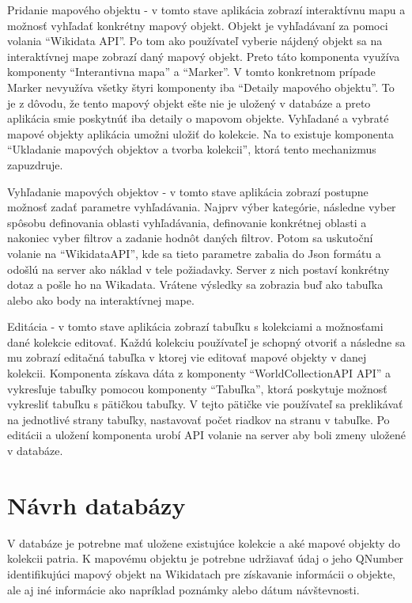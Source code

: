 Pridanie mapového objektu - v tomto stave aplikácia zobrazí interaktívnu mapu a možnosť vyhľadať konkrétny mapový objekt. Objekt je vyhľadávaní za pomoci volania “Wikidata API”.
Po tom ako používateľ vyberie nájdený objekt sa na interaktívnej mape zobrazí daný mapový objekt. Preto táto komponenta využíva komponenty “Interantivna mapa” a “Marker”. V tomto konkretnom prípade
Marker nevyužíva všetky štyri komponenty iba “Detaily mapového objektu”. To je z dôvodu, že tento mapový objekt ešte nie je uložený v databáze a preto aplikácia smie poskytnúť iba detaily o mapovom objekte.
Vyhľadané a vybraté mapové objekty aplikácia umožni uložiť do kolekcie. Na to existuje komponenta “Ukladanie mapových objektov a tvorba kolekcii”, ktorá tento mechanizmus zapuzdruje.

Vyhľadanie mapových objektov - v tomto stave aplikácia zobrazí postupne možnosť zadať parametre vyhľadávania. Najprv výber kategórie, následne vyber spôsobu definovania oblasti vyhľadávania, definovanie konkrétnej
oblasti a nakoniec vyber filtrov a zadanie hodnôt daných filtrov. Potom sa uskutoční volanie na “WikidataAPI”, kde sa tieto parametre zabalia do Json formátu a odošlú na server ako náklad v tele požiadavky. Server z nich postaví konkrétny dotaz a pošle ho
na Wikadata. Vrátene výsledky sa zobrazia buď ako tabuľka alebo ako body na interaktívnej mape.

Editácia - v tomto stave aplikácia zobrazí tabuľku s kolekciami a možnosťami dané kolekcie editovať. Každú kolekciu používateľ je schopný otvoriť a následne sa mu
zobrazí editačná tabuľka v ktorej vie editovať mapové objekty v danej kolekcii.
Komponenta získava dáta z komponenty “WorldCollectionAPI API” a vykresľuje tabuľky pomocou komponenty “Tabuľka”, ktorá poskytuje možnosť vykresliť tabuľku s pätičkou tabuľky.
V tejto pätičke vie používateľ sa preklikávať na jednotlivé strany tabuľky, nastavovať počet riadkov na stranu v tabuľke. Po editácii a uložení komponenta urobí API volanie
na server aby boli zmeny uložené v databáze.

\section{Návrh databázy}

V databáze je potrebne mať uložene existujúce kolekcie a aké mapové objekty do kolekcii patria. K mapovému objektu je potrebne udržiavať údaj o jeho QNumber
identifikujúci mapový objekt na Wikidatach pre získavanie informácii o objekte, ale aj iné informácie ako napríklad poznámky alebo dátum návštevnosti.

